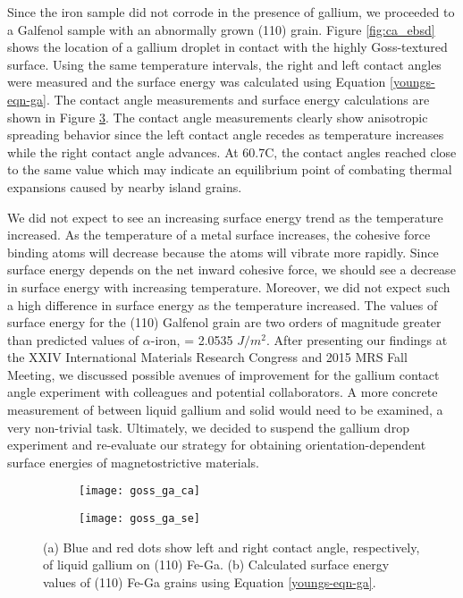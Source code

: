 Since the iron sample did not corrode in the presence of gallium, we proceeded to a Galfenol sample with an abnormally grown \hkl(110) grain. Figure \ref{fig:ca_ebsd} shows the location of a gallium droplet in contact with the highly Goss-textured surface. Using the same temperature intervals, the right and left contact angles were measured and the surface energy was calculated using Equation \ref{youngs-eqn-ga}. The contact angle measurements and surface energy calculations are shown in Figure \ref{fig:goss_se_msrmnt}. The contact angle measurements clearly show anisotropic spreading behavior since the left contact angle recedes as temperature increases while the right contact angle advances. At 60.7\degree C, the contact angles reached close to the same value which may indicate an equilibrium point of combating thermal expansions caused by nearby island grains. 

We did not expect to see an increasing surface energy trend as the temperature increased. As the temperature of a metal surface increases, the cohesive force binding atoms will decrease because the atoms will vibrate more rapidly. Since surface energy depends on the net inward cohesive force, we should see a decrease in surface energy with increasing temperature. Moreover, we did not expect such a high difference in surface energy as the temperature increased. The values of surface energy for the \hkl(110) Galfenol grain are two orders of magnitude greater than predicted values of $\alpha$-iron, \gamSV = 2.0535 $J/m^{2}$.\cite{Wang2000} After presenting our findings at the XXIV International Materials Research Congress and 2015 MRS Fall Meeting,\cite{VanOrder2015a,VanOrder2015} we discussed possible avenues of improvement for the gallium contact angle experiment with colleagues and potential collaborators. A more concrete measurement of \gamSL between liquid gallium and solid would need to be examined, a very non-trivial task. Ultimately, we decided to suspend the gallium drop experiment and re-evaluate our strategy for obtaining orientation-dependent surface energies of magnetostrictive materials. 

\begin{figure}[h]
	\centering
	\begin{subfigure}[c]{0.47\textwidth}
		\texttt{[image: goss\_ga\_ca]}
		\subcaption{~}
		\label{fig:goss_ga_ca}		
	\end{subfigure}
	\begin{subfigure}[c]{0.47\textwidth} 
		\texttt{[image: goss\_ga\_se]}
		\subcaption{~}
		\label{fig:goss_ga_se}		
	\end{subfigure}
	\caption{(a) Blue and red dots show left and right contact angle, respectively, of liquid gallium on \hkl(110) Fe-Ga. (b) Calculated surface energy values of \hkl(110) Fe-Ga grains using Equation \ref{youngs-eqn-ga}.}
	\label{fig:goss_se_msrmnt}
\end{figure}

